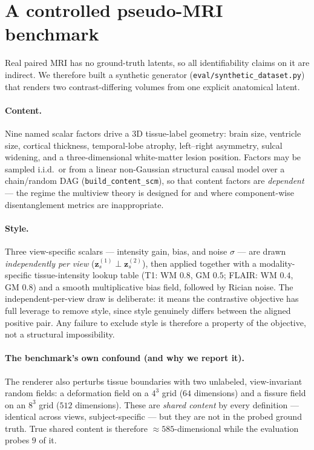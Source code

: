 \documentclass[11pt]{article}
\newcommand{\zs}{\mathbf{z}_s}
\begin{document}
\section{A controlled pseudo-MRI benchmark}
\label{sec:benchmark}

Real paired MRI has no ground-truth latents, so all identifiability claims on it
are indirect. We therefore built a synthetic generator
(\texttt{eval/synthetic\_dataset.py}) that renders two contrast-differing
volumes from one explicit anatomical latent.

\paragraph{Content.} Nine named scalar factors drive a 3D tissue-label
geometry: brain size, ventricle size, cortical thickness, temporal-lobe
atrophy, left--right asymmetry, sulcal widening, and a three-dimensional
white-matter lesion position. Factors may be sampled i.i.d.\ or from a linear
non-Gaussian structural causal model over a chain/random DAG
(\texttt{build\_content\_scm}), so that content factors are \emph{dependent} ---
the regime the multiview theory is designed for and where component-wise
disentanglement metrics are inappropriate.

\paragraph{Style.} Three view-specific scalars --- intensity gain, bias, and
noise $\sigma$ --- are drawn \emph{independently per view}
($\zs^{(1)} \perp \zs^{(2)}$), then applied together with a modality-specific
tissue-intensity lookup table (T1: WM $0.8$, GM $0.5$; FLAIR: WM $0.4$,
GM $0.8$) and a smooth multiplicative bias field, followed by Rician noise. The
independent-per-view draw is deliberate: it means the contrastive objective has
full leverage to remove style, since style genuinely differs between the aligned
positive pair. Any failure to exclude style is therefore a property of the
objective, not a structural impossibility.

\paragraph{The benchmark's own confound (and why we report it).} The renderer
also perturbs tissue boundaries with two unlabeled, view-invariant random
fields: a deformation field on a $4^3$ grid ($64$ dimensions) and a fissure
field on an $8^3$ grid ($512$ dimensions). These are \emph{shared content} by
every definition --- identical across views, subject-specific --- but they are
not in the probed ground truth. True shared content is therefore
$\approx\!585$-dimensional while the evaluation probes $9$ of it.
\end{document}

